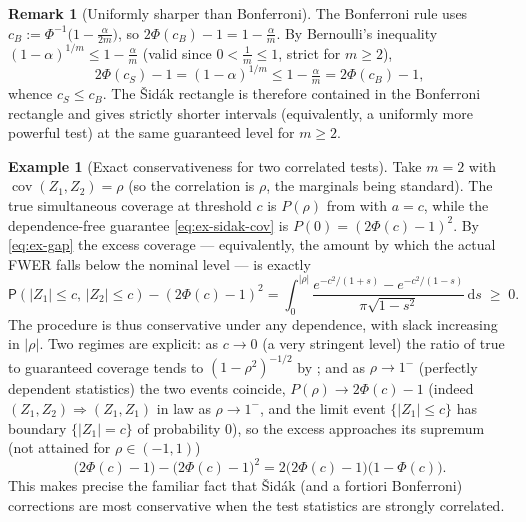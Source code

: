 \documentclass[12pt,a4paper]{article}
\theoremstyle{definition}
\newtheorem{example}[theorem]{Example}
\newtheorem{remark}[theorem]{Remark}
\newcommand{\PP}{\mathsf{P}}
\newcommand{\Cov}{\operatorname{cov}}
\newcommand{\dd}{\mathrm{d}}
\begin{document}
\begin{remark}[Uniformly sharper than Bonferroni]\label{rem:ex-bonf}
  The Bonferroni rule uses $c_B:=\Phi^{-1}\bigl(1-\tfrac{\alpha}{2m}\bigr)$,
  so $2\Phi(c_B)-1=1-\tfrac{\alpha}{m}$.  By Bernoulli's inequality
  $(1-\alpha)^{1/m}\leqslant 1-\tfrac{\alpha}{m}$ (valid since
  $0<\tfrac1m\leqslant 1$, strict for $m\geqslant 2$),
  \[
    2\Phi(c_S)-1=(1-\alpha)^{1/m}\leqslant 1-\tfrac{\alpha}{m}=2\Phi(c_B)-1,
  \]
  whence $c_S\leqslant c_B$.  The \v{S}id\'ak rectangle is therefore
  contained in the Bonferroni rectangle and gives strictly shorter
  intervals (equivalently, a uniformly more powerful test) at the same
  guaranteed level for $m\geqslant 2$.
\end{remark}

\begin{example}[Exact conservativeness for two correlated tests]
  \label{ex:fwer-exact}
  Take $m=2$ with $\Cov(Z_1,Z_2)=\rho$ (so the correlation is $\rho$,
  the marginals being standard).  The true simultaneous coverage at
  threshold $c$ is $P(\rho)$ from  with $a=c$, while the
  dependence-free guarantee \eqref{eq:ex-sidak-cov} is
  $P(0)=(2\Phi(c)-1)^2$.  By \eqref{eq:ex-gap} the excess coverage ---
  equivalently, the amount by which the actual FWER falls below the
  nominal level --- is exactly
  \[
    \PP(|Z_1|\leqslant c,\,|Z_2|\leqslant c)-(2\Phi(c)-1)^2
    =\int_0^{|\rho|}\frac{e^{-c^2/(1+s)}-e^{-c^2/(1-s)}}
      {\pi\sqrt{1-s^2}}\,\dd s\;\geqslant\;0 .
  \]
  The procedure is thus conservative under any dependence, with slack
  increasing in $|\rho|$.  Two regimes are explicit: as $c\to0$ (a very
  stringent level) the ratio of true to guaranteed coverage tends to
  $(1-\rho^2)^{-1/2}$ by ; and as $\rho\to1^-$
  (perfectly dependent statistics) the two events coincide,
  $P(\rho)\to 2\Phi(c)-1$ (indeed $(Z_1,Z_2)\Rightarrow(Z_1,Z_1)$ in
  law as $\rho\to1^-$, and the limit event $\{|Z_1|\leqslant c\}$ has
  boundary $\{|Z_1|=c\}$ of probability $0$), so the excess approaches its supremum
  (not attained for $\rho\in(-1,1)$)
  \[
    \bigl(2\Phi(c)-1\bigr)-\bigl(2\Phi(c)-1\bigr)^2
    =2\bigl(2\Phi(c)-1\bigr)\bigl(1-\Phi(c)\bigr).
  \]
  This makes precise the familiar fact that \v{S}id\'ak (and a fortiori
  Bonferroni) corrections are most conservative when the test statistics
  are strongly correlated.
\end{example}
\end{document}
